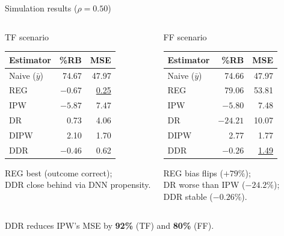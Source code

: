 \documentclass[aspectratio=169,11pt]{beamer}
\begin{document}
\begin{frame}{Simulation results ($\rho=0.50$)}
\begin{columns}[T]
\begin{block}{TF scenario}
\small
\begin{tabular}{lrr}
\toprule
Estimator & \%RB & MSE \\
\midrule
Naive ($\bar{y}$) & 74.67 & 47.97 \\
REG  & \underline{$-0.67$} & \underline{0.25} \\
IPW  & $-5.87$ & 7.47 \\
DR   & 0.73  & 4.06 \\
DIPW & 2.10  & 1.70 \\
DDR  & \underline{$-0.46$} & 0.62 \\
\bottomrule
\end{tabular}
\vspace{0.15cm}

REG best (outcome correct);\\
DDR close behind via DNN propensity.
\end{block}
\begin{block}{FF scenario}
\small
\begin{tabular}{lrr}
\toprule
Estimator & \%RB & MSE \\
\midrule
Naive ($\bar{y}$) & 74.66 & 47.97 \\
REG  & 79.06 & 53.81 \\
IPW  & $-5.80$ & 7.48 \\
DR   & \textbf{$-24.21$} & 10.07 \\
DIPW & 2.77  & 1.77 \\
DDR  & \underline{$-0.26$} & \underline{1.49} \\
\bottomrule
\end{tabular}
\vspace{0.15cm}

REG bias flips ($+79\%$);\\
DR worse than IPW ($-24.2\%$);\\
DDR stable ($-0.26\%$).
\end{block}
\end{columns}
\vspace{0.1cm}
\begin{center}
\small DDR reduces IPW's MSE by \textbf{92\%} (TF) and \textbf{80\%} (FF).
\end{center}
\end{frame}
\end{document}
